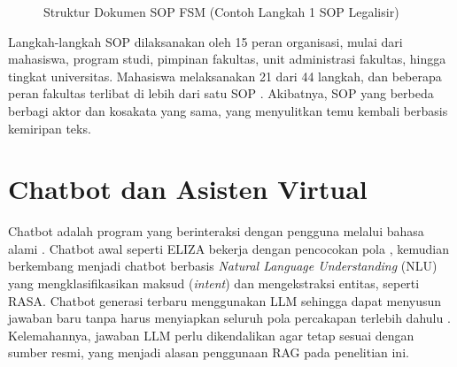 \begin{figure}[htbp]
\centering
{}
\caption{Struktur Dokumen SOP FSM (Contoh Langkah 1 SOP Legalisir)}
\label{fig:anatomi-sop}
\end{figure}

Langkah-langkah SOP dilaksanakan oleh 15 peran organisasi, mulai dari mahasiswa, program studi, pimpinan fakultas, unit administrasi fakultas, hingga tingkat universitas. Mahasiswa melaksanakan 21 dari 44 langkah, dan beberapa peran fakultas terlibat di lebih dari satu SOP \parencite{wiratama2026procedure}. Akibatnya, SOP yang berbeda berbagi aktor dan kosakata yang sama, yang menyulitkan temu kembali berbasis kemiripan teks.

\section{Chatbot dan Asisten Virtual}
\label{sec:chatbot}
Chatbot adalah program yang berinteraksi dengan pengguna melalui bahasa alami \parencite{adamopoulou2020overview}. Chatbot awal seperti ELIZA bekerja dengan pencocokan pola \parencite{weizenbaum1966eliza}, kemudian berkembang menjadi chatbot berbasis \textit{Natural Language Understanding} (NLU) yang mengklasifikasikan maksud (\textit{intent}) dan mengekstraksi entitas, seperti RASA. Chatbot generasi terbaru menggunakan LLM sehingga dapat menyusun jawaban baru tanpa harus menyiapkan seluruh pola percakapan terlebih dahulu \parencite{jurafsky2026slp}. Kelemahannya, jawaban LLM perlu dikendalikan agar tetap sesuai dengan sumber resmi, yang menjadi alasan penggunaan RAG pada penelitian ini.

